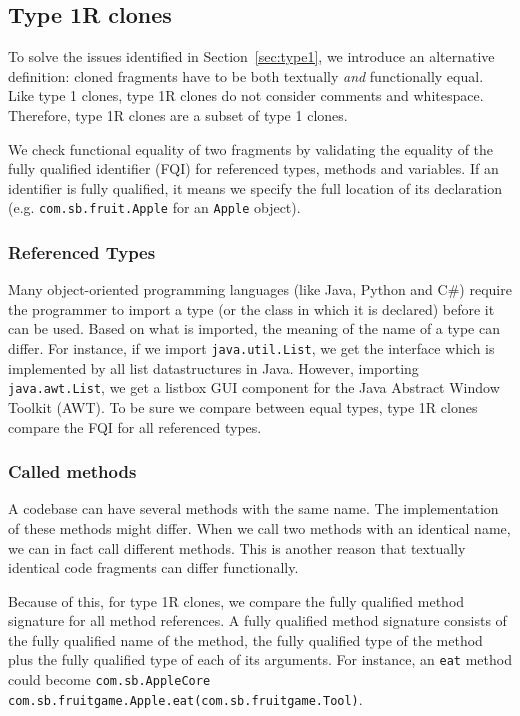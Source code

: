 \subsection{Type 1R clones} \label{sec:type1r}
To solve the issues identified in Section~\ref{sec:type1}, we introduce an alternative definition: cloned fragments have to be both textually \textit{and} functionally equal. Like type 1 clones, type 1R clones do not consider comments and whitespace. Therefore, type 1R clones are a subset of type 1 clones.

We check functional equality of two fragments by validating the equality of the fully qualified identifier (FQI) for referenced types, methods and variables. If an identifier is fully qualified, it means we specify the full location of its declaration (e.g. \texttt{com.sb.fruit.Apple} for an \texttt{Apple} object).

\subsubsection{Referenced Types}
Many object-oriented programming languages (like Java, Python and C\#) require the programmer to import a type (or the class in which it is declared) before it can be used. Based on what is imported, the meaning of the name of a type can differ. For instance, if we import \texttt{java.util.List}, we get the interface which is implemented by all list datastructures in Java. However, importing \texttt{java.awt.List}, we get a listbox GUI component for the Java Abstract Window Toolkit (AWT). To be sure we compare between equal types, type 1R clones compare the FQI for all referenced types.

\subsubsection{Called methods}
A codebase can have several methods with the same name. The implementation of these methods might differ. When we call two methods with an identical name, we can in fact call different methods. This is another reason that textually identical code fragments can differ functionally.

Because of this, for type 1R clones, we compare the fully qualified method signature for all method references. A fully qualified method signature consists of the fully qualified name of the method, the fully qualified type of the method plus the fully qualified type of each of its arguments. For instance, an \texttt{eat} method could become \texttt{com.sb.AppleCore com.sb.fruitgame.Apple.eat(com.sb.fruitgame.Tool)}.

